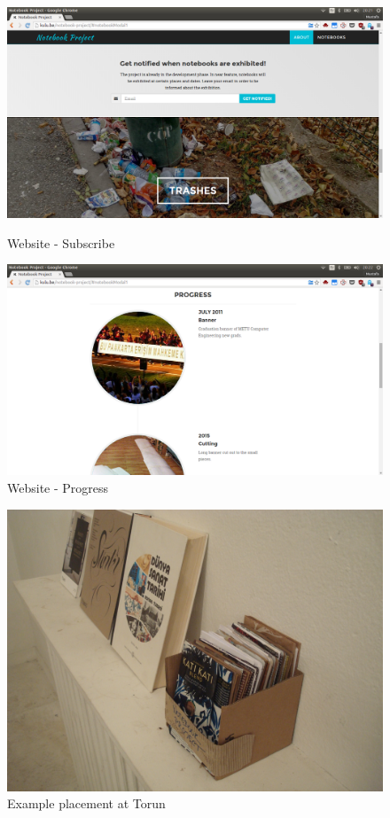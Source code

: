 \begin{figure}[!tbp]
  \centering
  \begin{minipage}[b]{0.48\textwidth}
    \includegraphics[width=\textwidth]{project_graphics/website_subscribe.png}
    \caption{Website - Subscribe}
    \label{fig:WebsiteSubscribe}
  \end{minipage}
  \hfill
  \begin{minipage}[b]{0.48\textwidth}
    \includegraphics[width=\textwidth]{project_graphics/website_progress.png}
    \caption{Website - Progress}
    \label{fig:WebsiteProgress}
  \end{minipage}
\end{figure}


\begin{figure}[h!]
  \centering
  \includegraphics[width=\textwidth]{project_graphics/placement_torun.jpg}
  \caption{Example placement at Torun}
  \label{fig:ExamplePlacementAtTorun}
\end{figure}